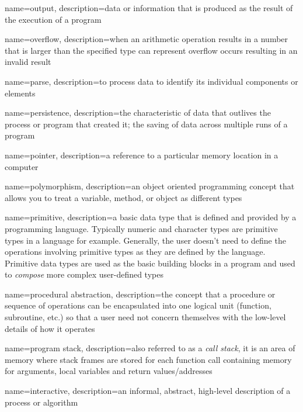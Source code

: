 {
  name=output,
  description={data or information that is produced as the result of the execution of a program}
}

{
  name=overflow,
  description={when an arithmetic operation results in a number that is larger than the specified type can represent overflow occurs resulting in an invalid result}
}

{
  name=parse,
  description={to process data to identify its individual components or elements}
}

{
  name=persistence,
  description={the characteristic of data that outlives the process or program that created it; the saving of data across multiple runs of a program}
}

{
  name=pointer,
  description={a reference to a particular memory location in a computer}
}

{
  name=polymorphism,
  description={an object oriented programming concept that allows you to treat a variable, method, or object as different types}
}

{
  name=primitive,
  description={a basic data type that is defined and provided by a programming language.  Typically numeric and character types are primitive types in a language for example.  Generally, the user doesn't need to define the operations involving primitive types as they are defined by the language.  Primitive data types are used as the basic building blocks in a program and used to \emph{compose} more complex user-defined types}
}

{
  name=procedural abstraction,
  description={the concept that a procedure or sequence of operations can be encapsulated into one logical unit (function, subroutine, etc.) so that a user need not concern themselves with the low-level details of how it operates}
}

{
  name=program stack,
  description={also referred to as a \emph{call stack}, it is an area of memory where stack frames are stored for each function call containing memory for arguments, local variables and return values/addresses}
}

{
  name=interactive,
  description={an informal, abstract, high-level description of a process or algorithm}
}

